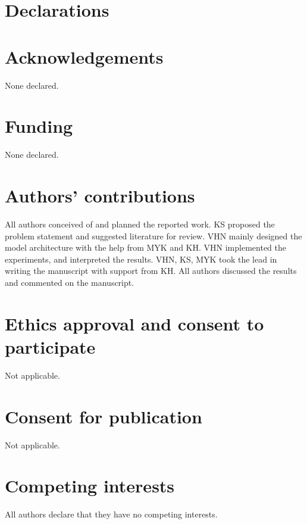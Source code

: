 \documentclass{bmcart}
\begin{document}



\section*{Declarations}
\begin{backmatter}

\section*{Acknowledgements}
None declared.

\section*{Funding}
None declared.

\section*{Authors’ contributions}
All authors conceived of and planned the reported work. KS proposed the problem statement and suggested literature for review. VHN mainly designed the model architecture with the help from MYK and KH. VHN implemented the experiments, and interpreted the results. VHN, KS, MYK took the lead in writing the manuscript with support from KH. All authors discussed the results and commented on the manuscript.

\section*{Ethics approval and consent to participate}
Not applicable.

\section*{Consent for publication}
Not applicable.

\section*{Competing interests}
  All authors declare that they have no competing interests.
  

\end{backmatter}
\end{document}
